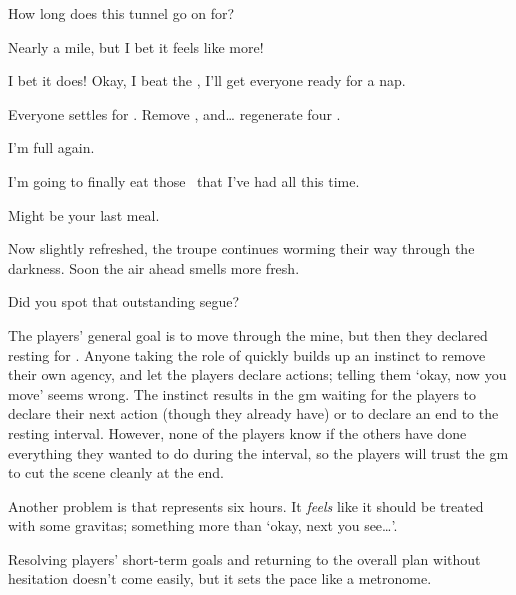 \begin{multicols}{2}
\begin{description}
  How long does this tunnel go on for?
  \item[\Glsentrytext{gm}:]
  Nearly a mile, but I bet it feels like more!
  \item[Player 1:]
  I bet it does!
  Okay, I beat the , I'll get everyone ready for a nap.
  \item[\Glsentrytext{gm}:]
  Everyone settles for .
  Remove , and\ldots
  regenerate four .
  \item[Player 1:]
  I'm full again.
  \item[Player 2:]
  I'm going to finally eat those \rations\ that I've had all this time.
  \item[Player 1:]
  Might be your last meal.

  \item[\Gls{gm}:]
  Now slightly refreshed, the troupe continues worming their way through the darkness.
  Soon the air ahead smells more fresh.
\end{description}

\bigLine
\vspace{2em}
\noindent
Did you spot that outstanding segue?

The players' general goal is to move through the mine, but then they declared resting for .
Anyone taking the role of  quickly builds up an instinct to remove their own agency, and let the players declare actions; telling them `okay, now you move' seems wrong.
The instinct results in the \gls{gm} waiting for the players to declare their next action (though they already have) or to declare an end to the resting \gls{interval}.
However, none of the players know if the others have done everything they wanted to do during the \gls{interval}, so the players will trust the \gls{gm} to cut the scene cleanly at the end.

Another problem is that  represents six hours.
It \emph{feels} like it should be treated with some gravitas; something more than `okay, next you see\ldots'.

Resolving players' short-term goals and returning to the overall plan without hesitation doesn't come easily, but it sets the pace like a metronome.

\bigLine


\end{multicols}
